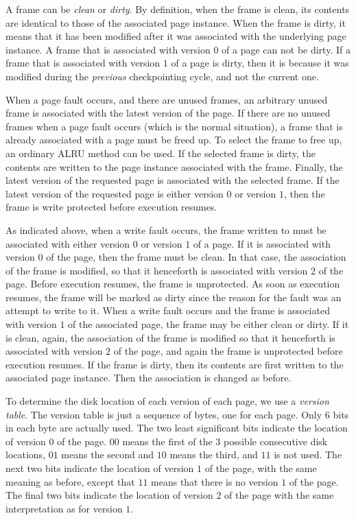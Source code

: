 A frame can be \emph{clean} or \emph{dirty}.  By definition, when the
frame is clean, its contents are identical to those of the associated
page instance.  When the frame is dirty, it means that it has been
modified after it was associated with the underlying page instance.  A
frame that is associated with version $0$ of a page can not be dirty.
If a frame that is associated with version $1$ of a page is dirty,
then it is because it was modified during the \emph{previous}
checkpointing cycle, and not the current one.

When a page fault occurs, and there are unused frames, an arbitrary
unused frame is associated with the latest version of the page.  If
there are no unused frames when a page fault occurs (which is the
normal situation), a frame that is already associated with a page must
be freed up.  To select the frame to free up, an ordinary ALRU method
can be used.  If the selected frame is dirty, the contents are written
to the page instance associated with the frame.  Finally, the latest
version of the requested page is associated with the selected frame.
If the latest version of the requested page is either version $0$ or
version $1$, then the frame is write protected before execution
resumes. 

As indicated above, when a write fault occurs, the frame written to
must be associated with either version $0$ or version $1$ of a page.
If it is associated with version $0$ of the page, then the frame must
be clean.  In that case, the association of the frame is modified, so
that it henceforth is associated with version $2$ of the page.  Before
execution resumes, the frame is unprotected.  As soon as execution
resumes, the frame will be marked as dirty since the reason for the
fault was an attempt to write to it.  When a write fault occurs and
the frame is associated with version $1$ of the associated page, the
frame may be either clean or dirty.  If it is clean, again, the
association of the frame is modified so that it henceforth is
associated with version $2$ of the page, and again the frame is
unprotected before execution resumes.  If the frame is dirty, then its
contents are first written to the associated page instance.  Then the
association is changed as before. 

To determine the disk location of each version of each page, we use a
\emph{version table}.  The version table is just a sequence of bytes,
one for each page.  Only 6 bits in each byte are actually used.  The
two least significant bits indicate the location of version $0$ of the
page.  $00$ means the first of the $3$ possible consecutive disk
locations, $01$ means the second and $10$ means the third, and $11$ is
not used.  The next two bits indicate the location of version $1$ of
the page, with the same meaning as before, except that $11$ means that
there is no version $1$ of the page.  The final two bits indicate the
location of version $2$ of the page with the same interpretation as
for version $1$. 

